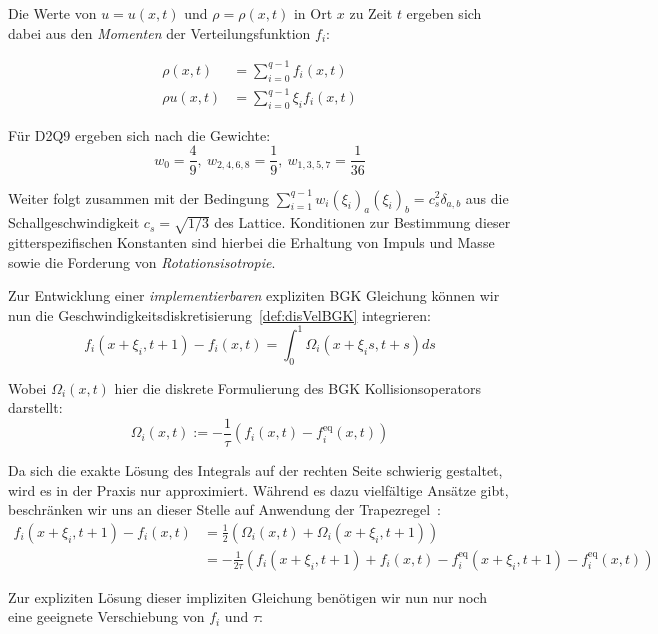 Die Werte von \(u = u(x,t)\) und \(\rho = \rho(x,t)\) in Ort \(x\) zu Zeit \(t\) ergeben sich dabei aus den \emph{Momenten} der Verteilungsfunktion \(f_i\):

\begin{Definition}
\label{def:Momente}
\begin{align*}
\rho(x,t) &= \sum_{i=0}^{q-1} f_i(x,t) \\
\rho u(x,t) &= \sum_{i=0}^{q-1} \xi_i f_i(x,t)
\end{align*}
\end{Definition}

Für D2Q9 ergeben sich nach \cite[Gl.~3.60 bzw. Tabelle~3.3]{Krueger17} die Gewichte:
\[w_0 = \frac{4}{9}, \ w_{2,4,6,8} = \frac{1}{9}, \ w_{1,3,5,7} = \frac{1}{36}\]

Weiter folgt zusammen mit der Bedingung \(\sum_{i=1}^{q-1} w_i (\xi_i)_a (\xi_i)_b = c_s^2 \delta_{a,b}\) aus \cite[Gl.~3.60]{Krueger17} die Schallgeschwindigkeit \(c_s = \sqrt{1/3}\) des Lattice. Konditionen zur Bestimmung dieser gitterspezifischen Konstanten sind hierbei die Erhaltung von Impuls und Masse sowie die Forderung von \emph{Rotationsisotropie}.

Zur Entwicklung einer \emph{implementierbaren} expliziten BGK Gleichung können wir nun die Geschwindigkeitsdiskretisierung~\ref{def:disVelBGK} integrieren:
\[ f_i(x+\xi_i, t+1) - f_i(x,t) = \int_0^1 \Omega_i(x+\xi_i s,t+s) ds \]

Wobei \(\Omega_i(x,t)\) hier die diskrete Formulierung des BGK Kollisionsoperators darstellt:
\[\Omega_i(x,t) := -\frac{1}{\tau} ( f_i(x,t) - f_i^\text{eq}(x, t) )\]

Da sich die exakte Lösung des Integrals auf der rechten Seite schwierig gestaltet, wird es in der Praxis nur approximiert. Während es dazu vielfältige Ansätze gibt, beschränken wir uns an dieser Stelle auf Anwendung der Trapezregel~\cite[Kap.~6]{AmannEscherII}:
\begin{align*}
f_i(x+\xi_i,t+1) - f_i(x,t) &= \frac{1}{2} \left( \Omega_i(x,t) + \Omega_i(x+\xi_i,t+1) \right) \\
&= -\frac{1}{2\tau} \left( f_i(x+\xi_i,t+1) + f_i(x,t) - f_i^\text{eq}(x+\xi_i,t+1) - f_i^\text{eq}(x,t) \right)
\end{align*}

Zur expliziten Lösung dieser impliziten Gleichung benötigen wir nun nur noch eine geeignete Verschiebung von \(f_i\) und \(\tau\):

